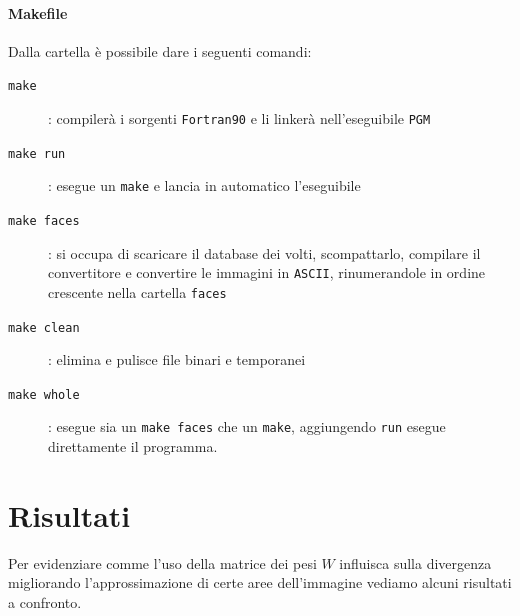 \documentclass[a4paper]{article} %
\begin{document}
\paragraph{Makefile}\label{makefile}
Dalla cartella è possibile dare i seguenti comandi:
\begin{description}
\item[\texttt{make}]: compilerà i sorgenti \texttt{Fortran90} e li linkerà nell'eseguibile \texttt{PGM}
\item[\texttt{make run}]: esegue un \texttt{make} e lancia in automatico l'eseguibile
\item[\texttt{make faces}]: si occupa di scaricare il database dei volti, scompattarlo, compilare il convertitore e convertire le immagini in \texttt{ASCII}, rinumerandole in ordine crescente nella cartella \texttt{faces}
\item[\texttt{make clean}]: elimina e pulisce file binari e temporanei
\item[\texttt{make whole}]: esegue sia un \texttt{make faces} che un \texttt{make}, aggiungendo \texttt{run} esegue direttamente il programma.
\end{description}


\section{Risultati}
Per evidenziare comme l'uso della matrice dei pesi $W$ influisca sulla divergenza migliorando l'approssimazione di certe aree dell'immagine vediamo alcuni risultati a confronto.
\end{document}
